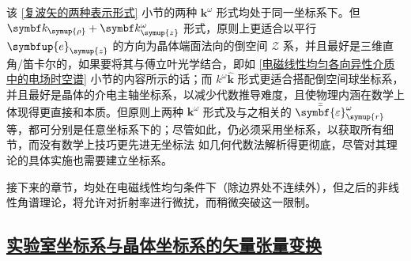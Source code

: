 该 \ref{复波矢的两种表示形式} 小节的两种 ${\symbf k}^\omega$ 形式均处于同一坐标系下。但 $\symbf k_{\symup{\rho}} + \symbf k^\omega_{\symup{z}}$ 形式，原则上更适合以平行 $\symbfup{e}_{\symup{z}}$ 的方向为晶体端面法向的倒空间 $\mathcal{Z}$ 系，并且最好是三维直角/笛卡尔的，如果要将其与傅立叶光学结合，即如 \ref{电磁线性均匀各向异性介质中的电场时空谱} 小节的内容所示的话；而 $k^\omega \hat{\symbf k}$ 形式更适合搭配倒空间球坐标系，并且最好是晶体的介电主轴坐标系，以减少代数推导难度，且使物理内涵在数学上体现得更直接和本质。但原则上两种 ${\symbf k}^\omega$ 形式及与之相关的 $\bar{\bar{\symbf{\varepsilon}}}_{\symup{r}}^{\omega}$ 等，都可分别是任意坐标系下的；尽管如此，仍必须采用坐标系，以获取所有细节，而没有数学上技巧更先进无坐标法 \cite{matosAnisotropyTensorsNovel2007,matosConicalRefractionGeneralized2011,chenCoordinatefreeApproachWave1981,chenCoordinateFreeApproach1982}如几何代数法\cite{matosAnisotropyTensorsNovel2007,matosConicalRefractionGeneralized2011}解析得更彻底，尽管对其理论的具体实施也需要建立坐标系。

接下来的章节，均处在电磁线性均匀条件下（除边界处不连续外），但之后的非线性角谱理论，将允许对折射率进行微扰，而稍微突破这一限制。

\subsection{\protect\hyperlink{chap:\thesubsection}{实验室坐标系与晶体坐标系的矢量张量变换}}
\label{实验室坐标系与晶体坐标系的矢量张量变换}

